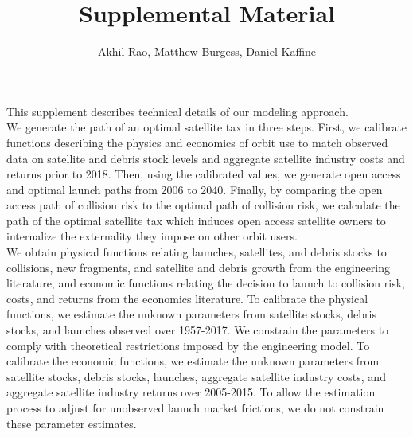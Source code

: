 \documentclass[12pt]{article}
\title{Supplemental Material}
\author{Akhil Rao, Matthew Burgess, Daniel Kaffine}
\begin{document}
	
	\maketitle
	
	\tableofcontents

\paragraph{}This supplement describes technical details of our modeling approach. \\

We generate the path of an optimal satellite tax in three steps. First, we calibrate functions describing the physics and economics of orbit use to match observed data on satellite and debris stock levels and aggregate satellite industry costs and returns prior to 2018. Then, using the calibrated values, we generate open access and optimal launch paths from 2006 to 2040. Finally, by comparing the open access path of collision risk to the optimal path of collision risk, we calculate the path of the optimal satellite tax which induces open access satellite owners to internalize the externality they impose on other orbit users. \\

We obtain physical functions relating launches, satellites, and debris stocks to collisions, new fragments, and satellite and debris growth from the engineering literature, and economic functions relating the decision to launch to collision risk, costs, and returns from the economics literature. To calibrate the physical functions, we estimate the unknown parameters from satellite stocks, debris stocks, and launches observed over 1957-2017. We constrain the parameters to comply with theoretical restrictions imposed by the engineering model. To calibrate the economic functions, we estimate the unknown parameters from satellite stocks, debris stocks, launches, aggregate satellite industry costs, and aggregate satellite industry returns over 2005-2015. To allow the estimation process to adjust for unobserved launch market frictions, we do not constrain these parameter estimates. \\
\end{document}
